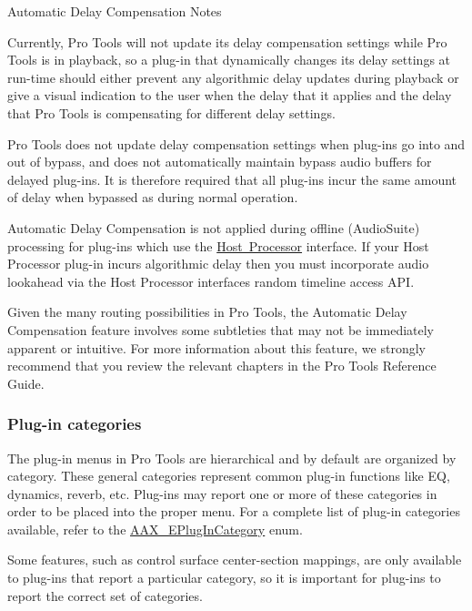 Automatic Delay Compensation Notes 
\begin{DoxyItemize}
\item Currently, Pro Tools will not update its delay compensation settings while Pro Tools is in playback, so a plug-\/in that dynamically changes its delay settings at run-\/time should either prevent any algorithmic delay updates during playback or give a visual indication to the user when the delay that it applies and the delay that Pro Tools is compensating for different delay settings. 
\item Pro Tools does not update delay compensation settings when plug-\/ins go into and out of bypass, and does not automatically maintain bypass audio buffers for delayed plug-\/ins. It is therefore required that all plug-\/ins incur the same amount of delay when bypassed as during normal operation.  
\item Automatic Delay Compensation is not applied during offline (Audio\+Suite) processing for plug-\/ins which use the \mbox{\hyperlink{a01833}{Host Processor}} interface. If your Host Processor plug-\/in incurs algorithmic delay then you must incorporate audio lookahead via the Host Processor interface\textquotesingle{}s random timeline access A\+PI.  
\item Given the many routing possibilities in Pro Tools, the Automatic Delay Compensation feature involves some subtleties that may not be immediately apparent or intuitive. For more information about this feature, we strongly recommend that you review the relevant chapters in the Pro Tools Reference Guide.  
\end{DoxyItemize}

\hypertarget{a00830_subsection__plugin_categories}{}\subsubsection{Plug-\/in categories}\label{a00830_subsection__plugin_categories}
 The plug-\/in menus in Pro Tools are hierarchical and by default are organized by category. These general categories represent common plug-\/in functions like EQ, dynamics, reverb, etc. Plug-\/ins may report one or more of these categories in order to be placed into the proper menu. For a complete list of plug-\/in categories available, refer to the \mbox{\hyperlink{a00491_aef9637518fb1ac0e2f403444c73aba4a}{A\+A\+X\+\_\+\+E\+Plug\+In\+Category}} enum.

Some features, such as control surface center-\/section mappings, are only available to plug-\/ins that report a particular category, so it is important for plug-\/ins to report the correct set of categories.

